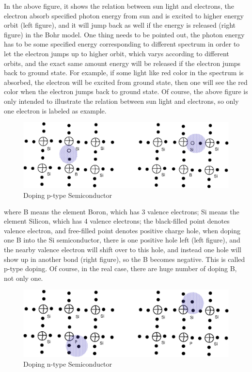 \documentclass[a4paper, 12pt, titlepage,oneside,drop]{kthesis}
\begin{document}
In the above figure, it shows the relation between sun light and electrons, the electron absorb specified photon energy from sun and is excited 
to higher energy orbit (left figure), and it will jump back as well if the energy is released (right figure) in the Bohr model. One thing needs to be pointed out,
the photon energy has to be some specified energy corresponding to different spectrum in order to let the electron jumps up to higher orbit, which varys according 
to different orbits, and the exact same amount energy will be released if the electron jumps back to ground state. For example, if some light like red color in
the spectrum is absorbed, the electron will be excited from ground state, then one will see the red color when the electron jumps back to ground state. Of course,
the above figure is only intended to illustrate the relation between sun light and electrons, so only one electron is labeled as example.

\begin{figure}[H]
\centering
\includegraphics[scale=0.7]{sc2.eps}
\caption{Doping p-type Semiconductor}
\label{sc2}
\end{figure}


where B means the element Boron, which has 3 valence electrons; Si means the element Silicon, which has 4 valence electrons; the black-filled point denotes valence
electron, and free-filled point denotes positive charge hole, when doping one B into the Si semiconductor, there is one positive hole left (left figure), and the
nearby valence electron will shift over to this hole, and instead one hole will show up in another bond (right figure), so the B becomes negative. This is called
p-type doping. Of course, in the real case, there are huge number of doping B, not only one.

\begin{figure}[H]
\centering
\includegraphics[scale=0.7]{sc3.eps}
\caption{Doping n-type Semiconductor}
\label{sc3}
\end{figure}
 
\end{document}
